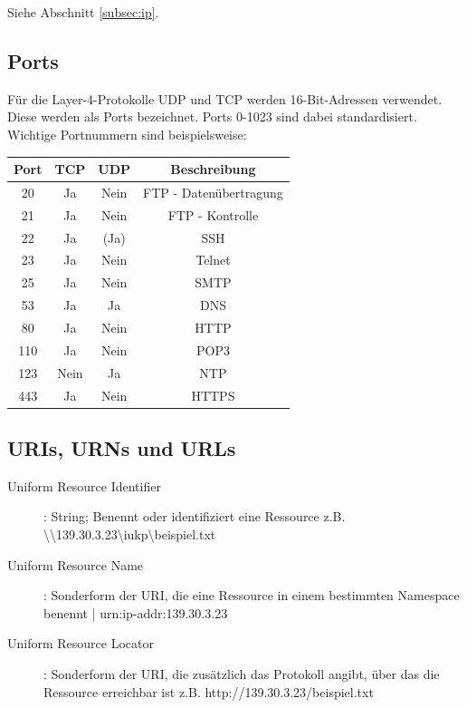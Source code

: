 \documentclass{article} %
\begin{document}
Siehe Abschnitt \ref{subsec:ip}.

\subsection{Ports}

Für die Layer-4-Protokolle UDP und TCP werden 16-Bit-Adressen verwendet.
Diese werden als Ports bezeichnet.
Ports 0-1023 sind dabei standardisiert.
Wichtige Portnummern sind beispielsweise:
\begin{center}
\begin{tabular}{|c|c|c|c|}
	\hline Port & TCP & UDP & Beschreibung \\ 
	\hline 20 & Ja & Nein & FTP - Datenübertragung \\ 
	\hline 21 & Ja & Nein & FTP - Kontrolle \\ 
	\hline 22 & Ja & (Ja) & SSH \\ 
	\hline 23 & Ja & Nein & Telnet \\ 
	\hline 25 & Ja & Nein & SMTP \\ 
	\hline 53 & Ja & Ja & DNS \\ 
	\hline 80 & Ja & Nein & HTTP \\ 
	\hline 110 & Ja & Nein & POP3 \\ 
	\hline 123 & Nein & Ja & NTP \\ 
	\hline 443 & Ja & Nein & HTTPS \\ 
	\hline 
\end{tabular} 
\end{center}
\subsection{URIs, URNs und URLs}
\begin{description}
\item [Uniform Resource Identifier]: String; Benennt oder identifiziert eine Ressource z.B.  \textbackslash\textbackslash139.30.3.23\textbackslash iukp\textbackslash beispiel.txt
\item [Uniform Resource Name]: Sonderform der URI, die eine Ressource in einem bestimmten
Namespace benennt | urn:ip-addr:139.30.3.23
\item [Uniform Resource Locator]: Sonderform der URI, die zusätzlich das Protokoll angibt, über das die Ressource erreichbar ist z.B. http://139.30.3.23/beispiel.txt
\end{description}
\end{document}

